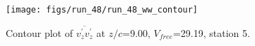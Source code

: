 \begin{figure}[H]
\centering
\texttt{[image: figs/run\_48/run\_48\_ww\_contour]}
\caption{Contour plot of $\overline{v_{z}^{\prime} v_{z}^{\prime}}$ at $z/c$=9.00, $V_{free}$=29.19, station 5.}
\label{fig:run_48_ww_contour}
\end{figure}


